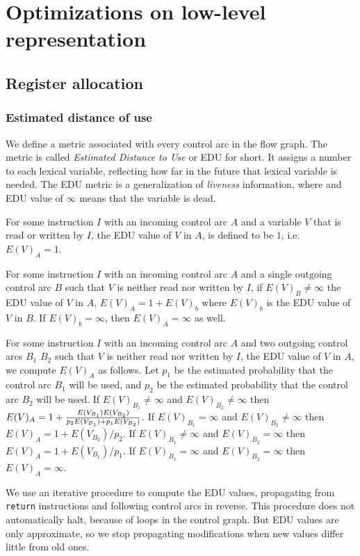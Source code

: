 \chapter{Optimizations on low-level representation}

\section{Register allocation}

\subsection{Estimated distance of use}

We define a metric associated with every control arc in the flow
graph.  The metric is called \emph{Estimated Distance to Use} or EDU
for short.  It assigns a number to each lexical variable, reflecting
how far in the future that lexical variable is needed.  The EDU metric
is a generalization of \emph{liveness} information, where and EDU
value of $\infty$ means that the variable is dead.

For some instruction $I$ with an incoming control arc $A$ and a
variable $V$ that is read or written by $I$, the EDU value of $V$ in
$A$, is defined to be $1$, i.e. $E(V)_A = 1$.

For some instruction $I$ with an incoming control arc $A$ and a single
outgoing control arc $B$ such that $V$ is neither read nor written by
$I$, if $E(V)_B \not = \infty$ the EDU value of $V$ in $A$, $E(V)_A =
1 + E(V)_b$ where $E(V)_b$ is the EDU value of $V$ in $B$.  If
$E(V)_b = \infty$, then $E(V)_A = \infty$ as well.

For some instruction $I$ with an incoming control arc $A$ and two
outgoing control arcs $B_1$ $B_2$ such that $V$ is neither read nor
written by $I$, the EDU value of $V$ in $A$, we compute $E(V)_A$ as
follows.  Let $p_1$ be the estimated probability that the control arc
$B_1$ will be used, and $p_2$ be the estimated probability that the
control arc $B_2$ will be used.  If $E(V)_{B_1} \not = \infty$ and
$E(V)_{B_2} \not = \infty$ then $E(V)_A = 1 + {{E(V_{B_1})E(V_{B_2})}
  \over {p_2 E(V_{B_1}) + p_1 E(V_{B_2})}}$.  If $E(V)_{B_1} = \infty$
and $E(V)_{B_2} \not = \infty$ then $E(V)_A = 1 + {{E(V_{B_2})} /
  p_2}$.  If $E(V)_{B_1} \not = \infty$ and $E(V)_{B_2} = \infty$ then
$E(V)_A = 1 + {{E(V_{B_1})} / p_1}$.  If $E(V)_{B_1} = \infty$ and
$E(V)_{B_2} = \infty$ then $E(V)_A = \infty$.

We use an iterative procedure to compute the EDU values, propagating
from \texttt{return} instructions and following control arcs in
reverse.  This procedure does not automatically halt, because of loops
in the control graph.  But EDU values are only approximate, so we stop
propagating modifications when new values differ little from old
ones.


